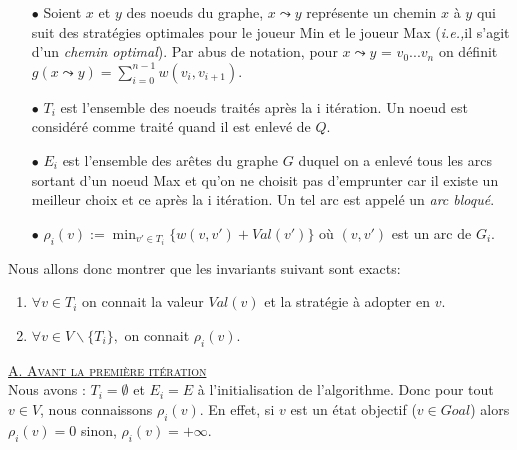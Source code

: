 \begin{itemize}
	\item[$\bullet$] Soient $x$ et $y$ des noeuds du graphe, $x \leadsto y$ représente un chemin $x$ à $y$ qui suit des stratégies optimales pour le joueur Min et le joueur Max (\emph{i.e.,}il s'agit d'un \emph{chemin optimal}). Par abus de notation, pour $x \leadsto y$ = $v_0 ...v_n$ on définit $g(x \leadsto y) = \sum_{i=0}^{n-1} w(v_i, v_{i+1})$.
	\item[$\bullet$] $T_{i}$ est l'ensemble des noeuds traités après la i itération. Un noeud est considéré comme traité quand il est enlevé de $Q$.
	\item[$\bullet$] $E_i$ est l'ensemble des arêtes du graphe $G$ duquel on a enlevé tous les arcs sortant d'un noeud Max et qu'on ne choisit pas d'emprunter car il existe un meilleur choix et ce après la i itération. Un tel arc est appelé un \emph{arc bloqué}.
	\item[$\bullet$] $\rho_i(v) := \min _{v' \in T_i}\{ w(v,v') + Val(v') \} $ où $(v,v')$ est un arc de $G_i$.
\end{itemize}

$\text{}$\\
\noindent Nous allons donc montrer que les invariants suivant sont exacts: 

\begin{enumerate}
	\item $\forall v \in T_i$ on connait la valeur $Val(v)$ et la stratégie à adopter en $v$.
	\item $\forall v \in V \backslash \{ T_i \},$ on connait $\rho_i(v)$.
\end{enumerate}
	
\noindent \underline{\textsc{A. Avant la première itération}}\\

Nous avons : $T_i = \emptyset$ et $E_i = E$ à l'initialisation de l'algorithme. Donc pour tout $v \in V$, nous connaissons $\rho_i(v)$. En effet, si $v$ est un état objectif ($v \in Goal$) alors $\rho_i(v) = 0$ sinon, $\rho_i(v) = + \infty$.\\

